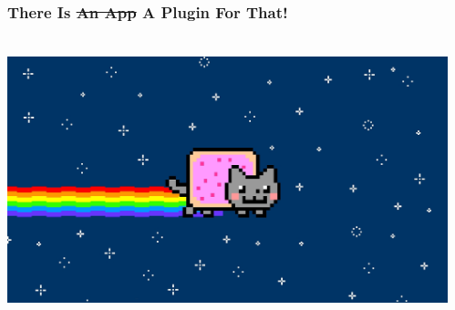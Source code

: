 \documentclass{beamer}
\begin{document}
\begin{frame}


    \frametitle{\textbf{There Is \sout{An App} A Plugin For That!}}

 \begin{columns}
 \begin{column}{0.45\textwidth}
         \includegraphics[height=7.5cm]{./pics/nyancat.jpg}
 \end{column}
 \begin{column}{0.65\textwidth}
 \end{column}
\end{columns}

\end{frame}
\end{document}
